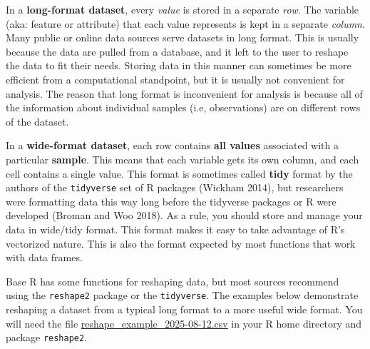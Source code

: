 \documentclass[
  13,
  letterpaper,
]{report}
\newenvironment{Shaded}{\begin{snugshade}}{\end{snugshade}}
\newcommand{\DocumentationTok}[1]{\textcolor[rgb]{0.37,0.37,0.37}{\textit{#1}}}
\newcommand{\FunctionTok}[1]{\textcolor[rgb]{0.28,0.35,0.67}{#1}}
\newcommand{\NormalTok}[1]{\textcolor[rgb]{0.00,0.23,0.31}{#1}}
\newcommand{\OtherTok}[1]{\textcolor[rgb]{0.00,0.23,0.31}{#1}}
\newcommand{\SpecialCharTok}[1]{\textcolor[rgb]{0.37,0.37,0.37}{#1}}
\newcommand{\StringTok}[1]{\textcolor[rgb]{0.13,0.47,0.30}{#1}}
\begin{document}
In a \textbf{long-format dataset}, every \emph{value} is stored in a
separate \emph{row}. The variable (aka: feature or attribute) that each
value represents is kept in a separate \emph{column}. Many public or
online data sources serve datasets in long format. This is usually
because the data are pulled from a database, and it left to the user to
reshape the data to fit their needs. Storing data in this manner can
sometimes be more efficient from a computational standpoint, but it is
usually not convenient for analysis. The reason that long format is
inconvenient for analysis is because all of the information about
individual samples (i.e, observations) are on different rows of the
dataset.

In a \textbf{wide-format dataset}, each row contains \textbf{all values}
associated with a particular \textbf{sample}. This means that each
variable gets its own column, and each cell contains a single value.
This format is sometimes called \textbf{tidy} format by the authors of
the \texttt{tidyverse} set of R packages (Wickham 2014), but researchers
were formatting data this way long before the tidyverse packages or R
were developed (Broman and Woo 2018). As a rule, you should store and
manage your data in wide/tidy format. This format makes it easy to take
advantage of R's vectorized nature. This is also the format expected by
most functions that work with data frames.

Base R has some functions for reshaping data, but most sources recommend
using the \texttt{reshape2} package or the \texttt{tidyverse}. The
examples below demonstrate reshaping a dataset from a typical long
format to a more useful wide format. You will need the file
\href{https://greenquanteco.github.io/reshape_example_2025-08-12.csv}{reshape\_example\_2025-08-12.csv}
in your R home directory and package \texttt{reshape2}.

\begin{Shaded}
\end{Shaded}
\end{document}
